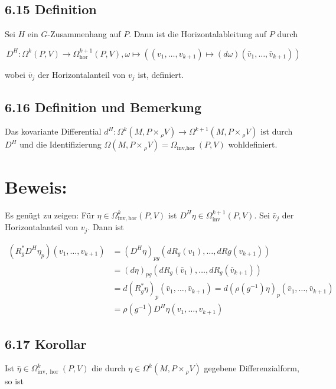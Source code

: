 \documentclass[10pt, letterpaper]{article}
\begin{document}
\subsection*{6.15 Definition}
Sei $H$ ein $G$-Zusammenhang auf $P$. Dann ist die Horizontalableitung auf $P$ durch

$$
D^{H}: \Omega^{k}(P, V) \rightarrow \Omega_{\mathrm{hor}}^{k+1}(P, V), \omega \mapsto\left(\left(v_{1}, \ldots, v_{k+1}\right) \mapsto(d \omega)\left(\bar{v}_{1}, \ldots, \bar{v}_{k+1}\right)\right)
$$

wobei $\bar{v}_{j}$ der Horizontalanteil von $v_{j}$ ist, definiert.

\subsection*{6.16 Definition und Bemerkung}
Das kovariante Differential $d^{H}: \Omega^{k}\left(M, P \times{ }_{\rho} V\right) \rightarrow \Omega^{k+1}\left(M, P \times{ }_{\rho} V\right)$ ist durch $D^{H}$ und die Identifizierung $\Omega\left(M, P \times{ }_{\rho} V\right)=\Omega_{\text {inv,hor }}(P, V)$ wohldefiniert.

\section*{Beweis:}
Es genügt zu zeigen: Für $\eta \in \Omega_{\mathrm{inv}, \mathrm{hor}}^{k}(P, V)$ ist $D^{H} \eta \in \Omega_{\mathrm{inv}}^{k+1}(P, V)$. Sei $\bar{v}_{j}$ der Horizontalanteil von $v_{j}$. Dann ist

$$
\begin{aligned}
\left(R_{g}^{*} D^{H} \eta_{p}\right)\left(v_{1}, \ldots, v_{k+1}\right) & =\left(D^{H} \eta\right)_{p g}\left(d R_{g}\left(v_{1}\right), \ldots, d R g\left(v_{k+1}\right)\right) \\
& =(d \eta)_{p g}\left(d R_{g}\left(\bar{v}_{1}\right), \ldots, d R_{g}\left(\bar{v}_{k+1}\right)\right) \\
& =d\left(R_{g}^{*} \eta\right)_{p}\left(\bar{v}_{1}, \ldots, \bar{v}_{k+1}\right)=d\left(\rho\left(g^{-1}\right) \eta\right)_{p}\left(\bar{v}_{1}, \ldots, \bar{v}_{k+1}\right) \\
& =\rho\left(g^{-1}\right) D^{H} \eta\left(v_{1}, \ldots, v_{k+1}\right)
\end{aligned}
$$

\subsection*{6.17 Korollar}
Ist $\hat{\eta} \in \Omega_{\mathrm{inv}, \text { hor }}^{k}(P, V)$ die durch $\eta \in \Omega^{k}\left(M, P \times{ }_{\rho} V\right)$ gegebene Differenzialform, so ist
\end{document}
